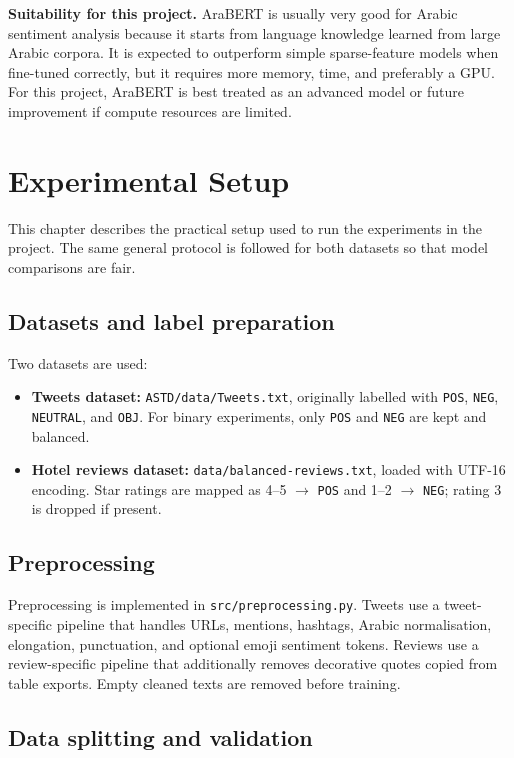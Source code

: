 \documentclass[11pt,a4paper]{report}
\begin{document}
\textbf{Suitability for this project.} AraBERT is usually very good for Arabic sentiment analysis because it starts from language knowledge learned from large Arabic corpora. It is expected to outperform simple sparse-feature models when fine-tuned correctly, but it requires more memory, time, and preferably a GPU. For this project, AraBERT is best treated as an advanced model or future improvement if compute resources are limited.

\chapter{Experimental Setup}

This chapter describes the practical setup used to run the experiments in the project. The same general protocol is followed for both datasets so that model comparisons are fair.

\section{Datasets and label preparation}

Two datasets are used:
\begin{itemize}[noitemsep]
    \item \textbf{Tweets dataset:} \texttt{ASTD/data/Tweets.txt}, originally labelled with \texttt{POS}, \texttt{NEG}, \texttt{NEUTRAL}, and \texttt{OBJ}. For binary experiments, only \texttt{POS} and \texttt{NEG} are kept and balanced.
    \item \textbf{Hotel reviews dataset:} \texttt{data/balanced-reviews.txt}, loaded with UTF-16 encoding. Star ratings are mapped as 4--5 $\rightarrow$ \texttt{POS} and 1--2 $\rightarrow$ \texttt{NEG}; rating 3 is dropped if present.
\end{itemize}

\section{Preprocessing}

Preprocessing is implemented in \texttt{src/preprocessing.py}. Tweets use a tweet-specific pipeline that handles URLs, mentions, hashtags, Arabic normalisation, elongation, punctuation, and optional emoji sentiment tokens. Reviews use a review-specific pipeline that additionally removes decorative quotes copied from table exports. Empty cleaned texts are removed before training.

\section{Data splitting and validation}
\end{document}
